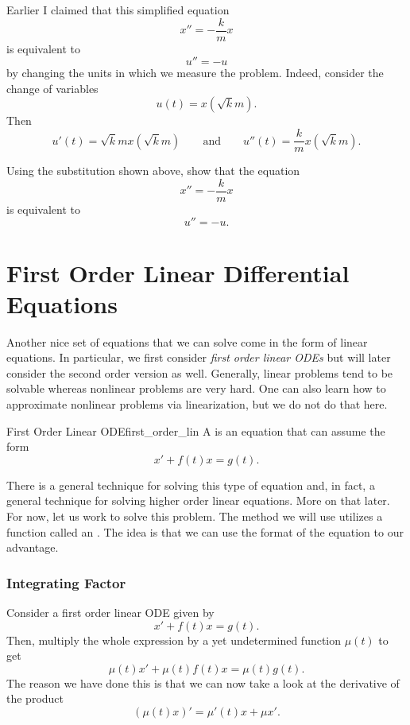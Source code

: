         Earlier I claimed that this simplified equation
        \[
        x'' = -\frac{k}{m}x
        \]
        is equivalent to
        \[
        u''=-u
        \]
        by changing the units in which we measure the problem.  Indeed, consider the change of variables
        \[
        u(t)=x\left( \sqrt{k}{m}\right).
        \]
        Then 
        \[
        u'(t)=\sqrt{k}{m}x\left(\sqrt{k}{m}\right) \qquad \textrm{and} \qquad u''(t)=\frac{k}{m}x\left( \sqrt{k}{m}\right).
        \]
        
        \begin{exercise}
        Using the substitution shown above, show that the equation
        \[
        x'' = -\frac{k}{m}x
        \]
        is equivalent to
        \[
        u''=-u.
        \]
        \end{exercise}
        
        \section{First Order Linear Differential Equations}
        
        Another nice set of equations that we can solve come in the form of linear equations.  In particular, we first consider \emph{first order linear ODEs} but will later consider the second order version as well.  Generally, linear problems tend to be solvable whereas nonlinear problems are very hard.  One can also learn how to approximate nonlinear problems via linearization, but we do not do that here.
        
        \begin{df}{First Order Linear ODE}{first_order_lin}
            A  is an equation that can assume the form
            \[
            x'+f(t)x=g(t).
            \]
        \end{df}
        
        There is a general technique for solving this type of equation and, in fact, a general technique for solving higher order linear equations.  More on that later.  For now, let us work to solve this problem.  The method we will use utilizes a function called an . The idea is that we can use the format of the equation to our advantage.
        
        \subsubsection{Integrating Factor}
        Consider a first order linear ODE given by
        \[
        x'+f(t)x=g(t).
        \]
        Then, multiply the whole expression by a yet undetermined function $\mu(t)$ to get
        \begin{equation}
        \mu(t)x'+\mu(t)f(t)x=\mu(t)g(t). \label{eq:int_fact_1}
        \end{equation}
        The reason we have done this is that we can now take a look at the derivative of the product
        \begin{equation}
        \left( \mu(t)x\right)'= \mu'(t)x+\mu x'. \label{eq:int_fact_2}
        \end{equation}

